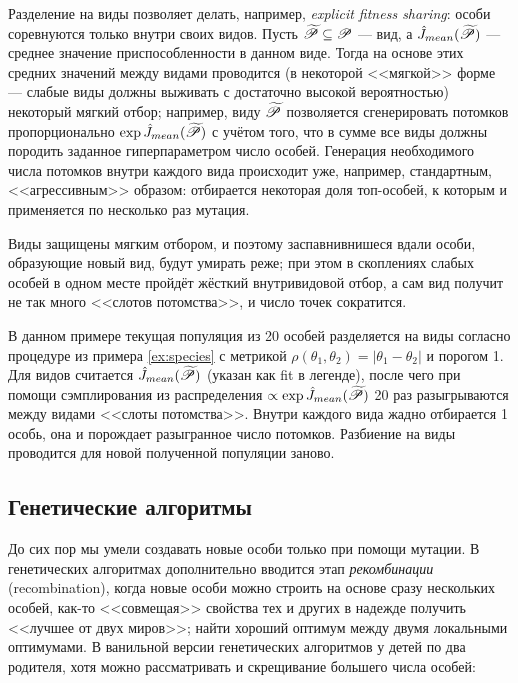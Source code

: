 Разделение на виды позволяет делать, например, \emph{explicit fitness sharing}: особи соревнуются только внутри своих видов. Пусть $\widetilde{\mathscr{P}} \subseteq \mathscr{P}$ --- вид, а $\hat{J}_{\mathop{mean}}(\widetilde{\mathscr{P}})$ --- среднее значение приспособленности в данном виде. Тогда на основе этих средних значений между видами проводится (в некоторой <<мягкой>> форме --- слабые виды должны выживать с достаточно высокой вероятностью) некоторый мягкий отбор; например, виду $\widetilde{\mathscr{P}}$ позволяется сгенерировать потомков пропорционально $\exp \hat{J}_{\mathop{mean}}(\widetilde{\mathscr{P}})$ с учётом того, что в сумме все виды должны породить заданное гиперпараметром число особей. Генерация необходимого числа потомков внутри каждого вида происходит уже, например, стандартным, <<агрессивным>> образом: отбирается некоторая доля топ-особей, к которым и применяется по несколько раз мутация.

Виды защищены мягким отбором, и поэтому заспавнивнишеся вдали особи, образующие новый вид, будут умирать реже; при этом в скоплениях слабых особей в одном месте пройдёт жёсткий внутривидовой отбор, а сам вид получит не так много <<слотов потомства>>, и число точек сократится.

\begin{example}
В данном примере текущая популяция из 20 особей разделяется на виды согласно процедуре из примера \ref{ex:species} с метрикой $\rho(\theta_1, \theta_2) = |\theta_1 - \theta_2|$ и порогом 1. Для видов считается $\hat{J}_{\mathop{mean}}(\widetilde{\mathscr{P}})$ (указан как fit в легенде), после чего при помощи сэмплирования из распределения $\propto \exp \hat{J}_{\mathop{mean}}(\widetilde{\mathscr{P}})$ 20 раз разыгрываются между видами <<слоты потомства>>. Внутри каждого вида жадно отбирается 1 особь, она и порождает разыгранное число потомков. Разбиение на виды проводится для новой полученной популяции заново.
\begin{center}
\end{center}
\end{example}

\subsection{Генетические алгоритмы}

До сих пор мы умели создавать новые особи только при помощи мутации. В генетических алгоритмах дополнительно вводится этап \emph{рекомбинации} (recombination), когда новые особи можно строить на основе сразу нескольких особей, как-то <<совмещая>> свойства тех и других в надежде получить <<лучшее от двух миров>>; найти хороший оптимум между двумя локальными оптимумами. В ванильной версии генетических алгоритмов у детей по два родителя, хотя можно рассматривать и скрещивание большего числа особей:

